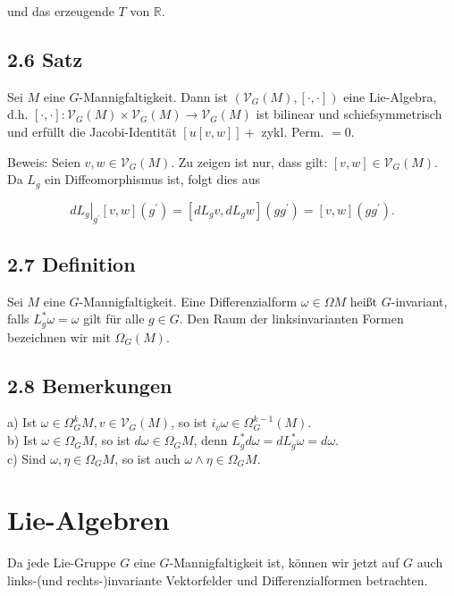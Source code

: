 \documentclass[10pt, letterpaper]{article}
\begin{document}
und das erzeugende $T$ von $\mathbb{R}$.

\subsection*{2.6 Satz}
Sei $M$ eine $G$-Mannigfaltigkeit. Dann ist $\left(\mathcal{V}_{G}(M),[\cdot, \cdot]\right)$ eine Lie-Algebra, d.h. $[\cdot, \cdot]: \mathcal{V}_{G}(M) \times \mathcal{V}_{G}(M) \rightarrow \mathcal{V}_{G}(M)$ ist bilinear und schiefsymmetrisch und erfüllt die Jacobi-Identität $[u[v, w]]+$ zykl. Perm. $=0$.

Beweis: Seien $v, w \in \mathcal{V}_{G}(M)$. Zu zeigen ist nur, dass gilt: $[v, w] \in \mathcal{V}_{G}(M)$. Da $L_{g}$ ein Diffeomorphismus ist, folgt dies aus

$$
\left.d L_{g}\right|_{g^{\prime}}[v, w]\left(g^{\prime}\right)=\left[d L_{g} v, d L_{g} w\right]\left(g g^{\prime}\right)=[v, w]\left(g g^{\prime}\right) .
$$

\subsection*{2.7 Definition}
Sei $M$ eine $G$-Mannigfaltigkeit. Eine Differenzialform $\omega \in \Omega M$ heißt $G$-invariant, falls $L_{g}^{*} \omega=\omega$ gilt für alle $g \in G$. Den Raum der linksinvarianten Formen bezeichnen wir mit $\Omega_{G}(M)$.

\subsection*{2.8 Bemerkungen}
a) Ist $\omega \in \Omega_{G}^{k} M, v \in \mathcal{V}_{G}(M)$, so ist $i_{v} \omega \in \Omega_{G}^{k-1}(M)$.\\
b) Ist $\omega \in \Omega_{G} M$, so ist $d \omega \in \Omega_{G} M$, denn $L_{g}^{*} d \omega=d L_{g}^{*} \omega=d \omega$.\\
c) Sind $\omega, \eta \in \Omega_{G} M$, so ist auch $\omega \wedge \eta \in \Omega_{G} M$.


\pagebreak

\section{Lie-Algebren}

Da jede Lie-Gruppe $G$ eine $G$-Mannigfaltigkeit ist, können wir jetzt auf $G$ auch links-(und rechts-)invariante Vektorfelder und Differenzialformen betrachten.
\end{document}
